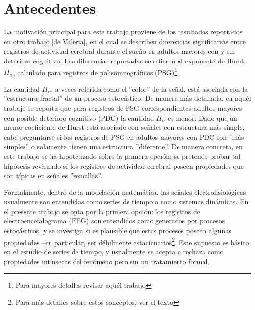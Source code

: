 \documentclass[12pt,a4paper]{mitthesis}
\begin{document}

\chapter{Antecedentes}

La motivaci\'on principal para este trabajo proviene de los resultados reportados en otro trabajo 
[de Valeria], en el cual se describen diferencias significaivas entre registros de actividad
cerebral durante el sue\~no en adultos mayores con y sin deterioro cognitivo. Las diferencias 
reportadas se refieren al exponente de Hurst, $H_\alpha$, calculado para registros de
polisomnogr\'aficos (PSG)\footnote{Para mayores detalles revisar aqu\'el trabajo}.

La cantidad $H_\alpha$, a veces referida como el ''color'' de la se\~nal, est\'a asociada con la
''estructura fractal'' de un proceso estoc\'astico. De manera m\'as detallada, en aqu\'el trabajo 
se reporta que para registros de PSG correspondientes adultos mayores con posible deterioro
cognitivo (PDC) la cantidad $H_\alpha$ es menor. Dado que un menor coeficiente de Hurst est\'a 
asociado con se\~nales con estructura m\'as simple, cabe preguntarse si los registros de PSG en 
adultos mayores con PDC son ''m\'as simples'' o solamente tienen una estructura ''diferente''. De 
manera concreta, en este trabajo se ha hipotetizado sobre la primera opci\'on; se pretende probar
tal hip\'otesis revisando si los registros de actividad cerebral poseen propiedades que son
t\'ipicas en se\~nales ''sencillas''.

Formalmente, dentro de la modelaci\'on matem\'atica, las se\~nales electrofisiol\'ogicas usualmente 
son entendidas como series de tiempo o como sistemas din\'amicos.
En el presente trabajo se opta por la primera opci\'on: los registros de electroencefalograma (EEG)
son entendidos como generados por procesos estoc\'asticos, y se investiga si es plausible que estos
procesos posean algunas propiedades --en particular, ser d\'ebilmente estacionarios\footnote{Para
m\'as detalles sobre estos conceptos, ver el texto}.
Este supuesto es b\'asico en el estudio de series de tiempo, y usualmente se acepta o rechaza como 
propiedades int\'insecas del fen\'omeno pero sin un tratamiento formal.
\end{document}
